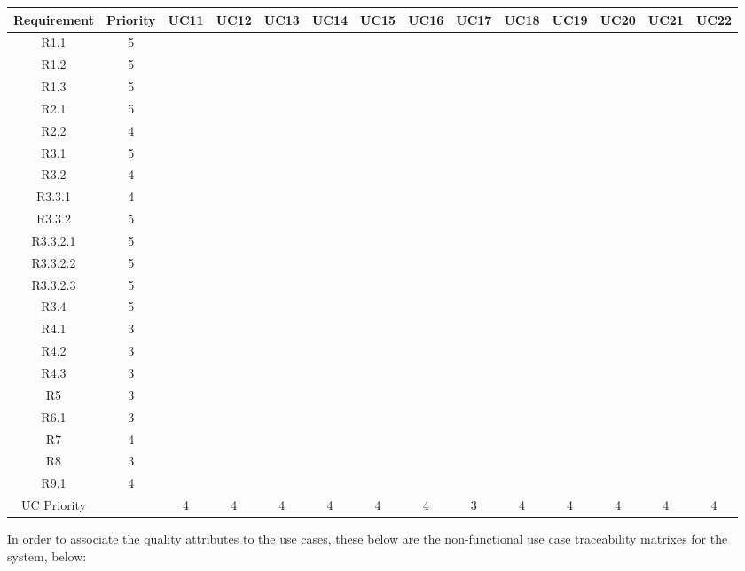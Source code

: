 \documentclass[11pt]{article}
\begin{document}
\begin{center}
	\hspace*{-1.1cm}\begin{tabular}{|c|c|c|c|c|c|c|c|c|c|c|c|c|c|}
	\hline
	Requirement & Priority & UC11 & UC12 & UC13 & UC14 & UC15 & UC16 & UC17 & UC18 & UC19 & UC20 & UC21 & UC22 \\
	\hline
	R1.1 & 5 & & & & & & & & & & & & \\
	\hline
	R1.2 & 5 & & & & & & & & & & & &\\
	\hline
	R1.3 & 5 & & & & & & & & & & & &\\
	\hline
	R2.1 & 5 & & & & & & & & & & & &\\
	\hline
	R2.2 & 4 & & & & & & & & & & & &\\
	\hline 
	R3.1 & 5 & & & & & & & & & & & &\\
	\hline
	R3.2 & 4 & & & & & & & & & & & &\\
	\hline
	R3.3.1 & 4 & & & & & & & & & & & & \\
	\hline
	R3.3.2 & 5 & & & & & & & & & & & &\\
	\hline
	R3.3.2.1 & 5 & & & & & & & & &  & & &\\
	\hline
	R3.3.2.2 & 5 & & & & & & & & & & & &\\
	\hline
	R3.3.2.3 & 5 & & & & & & & & & & & &\\
	\hline
	R3.4 & 5 & & & & & & & & & & & &\\
	\hline
	R4.1 & 3 & & & & & & & & & & & &\\
	\hline 
	R4.2 & 3 & & & & & & & & & & & &\\
	\hline
	R4.3 & 3 & & & & & & & & & & & &\\
	\hline
	R5 & 3 & & & & & & & & & & & &\\
	\hline
	R6.1 & 3 & & & & & & & & & & & &\\
	\hline
	R7 & 4 & & & & & & & & & & & &\\
	\hline
	R8 & 3 & & & & & & & & & & & &\\
	\hline
	R9.1 & 4 & & & & & & & & & & & & \\
	\hline
	UC Priority & & 4 & 4 & 4 & 4 & 4 & 4 & 3 & 4 & 4 & 4 & 4 & 4 \\
	\hline
	\end{tabular}
\end{center}

In order to associate the quality attributes to the use cases, these below are the non-functional use case traceability matrixes for the system, below: 
\end{document}
